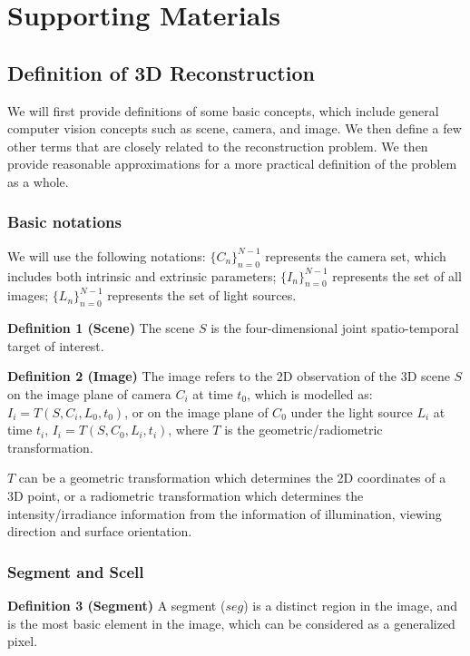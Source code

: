 
\chapter{Supporting Materials}

\section{Definition of 3D Reconstruction}
\label{sec:3DRecon_Def}
We will first provide definitions of some basic concepts, which include general computer vision concepts such as scene, camera, and image. We then define a few other terms that are closely related to the reconstruction problem. We then provide reasonable approximations for a more practical definition of the problem as a whole.

\subsection{Basic notations}
We will use the following notations: $\{C_n\}_{n=0}^{N-1}$ represents the camera set, which includes both intrinsic and extrinsic parameters; $\{I_n\}_{n=0}^{N-1}$ represents the set of all images; $\{L_n\}_{n=0}^{N-1}$ represents the set of light sources.

\noindent\textbf{Definition 1 (Scene)} The scene $S$ is the four-dimensional joint spatio-temporal target of interest.

\noindent\textbf{Definition 2 (Image)} The image refers to the 2D observation of the 3D scene $S$ on the image plane of camera $C_i$ at time $t_0$, which is modelled as: $I_i = T(S, C_i, L_0, t_0)$, or on the image plane of $C_0$  under the light source $L_i$ at time $t_i$, $I_i= T(S, C_0, L_i, t_i)$, where $T$ is the geometric/radiometric transformation.

$T$ can be a geometric transformation which determines the 2D coordinates of a 3D point, or a radiometric transformation which determines the intensity/irradiance information from the information of illumination, viewing direction and surface orientation.

\subsection{Segment and Scell}
\noindent\textbf{Definition 3 (Segment)} A segment ($seg$) is a distinct region in the image, and is the most basic element in the image, which can be considered as a generalized pixel. 

